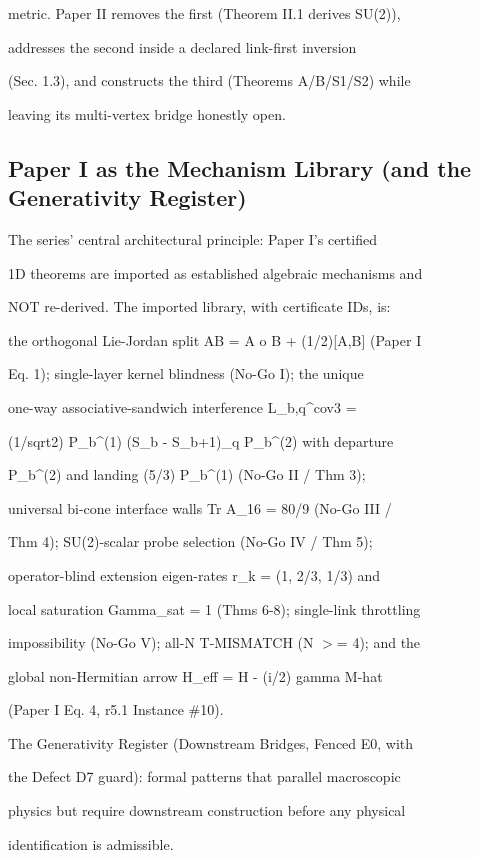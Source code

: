 \documentclass[11pt,a4paper]{article}
\theoremstyle{definition}
\begin{document}
metric. Paper II removes the first (Theorem II.1 derives SU(2)),

addresses the second inside a declared link-first inversion

(Sec. 1.3), and constructs the third (Theorems A/B/S1/S2) while

leaving its multi-vertex bridge honestly open.


\subsection{Paper I as the Mechanism Library (and the Generativity Register)}

The series' central architectural principle: Paper I's certified

1D theorems are imported as established algebraic mechanisms and

NOT re-derived. The imported library, with certificate IDs, is:

the orthogonal Lie-Jordan split AB = A o B + (1/2)[A,B] (Paper I

Eq. 1); single-layer kernel blindness (No-Go I); the unique

one-way associative-sandwich interference L\_b,q\^{}{cov3} =

(1/sqrt2) P\_b\^{}{(1)} (S\_b - S\_{b+1})\_q P\_b\^{}{(2)} with departure

P\_b\^{}{(2)} and landing (5/3) P\_b\^{}{(1)} (No-Go II / Thm 3);

universal bi-cone interface walls Tr A\_16 = 80/9 (No-Go III /

Thm 4); SU(2)-scalar probe selection (No-Go IV / Thm 5);

operator-blind extension eigen-rates r\_k = (1, 2/3, 1/3) and

local saturation Gamma\_sat = 1 (Thms 6-8); single-link throttling

impossibility (No-Go V); all-N T-MISMATCH (N $>$= 4); and the

global non-Hermitian arrow H\_eff = H - (i/2) gamma M-hat

(Paper I Eq. 4, r5.1 Instance \#10).


The Generativity Register (Downstream Bridges, Fenced E0, with

the Defect D7 guard): formal patterns that parallel macroscopic

physics but require downstream construction before any physical

identification is admissible.
\end{document}
